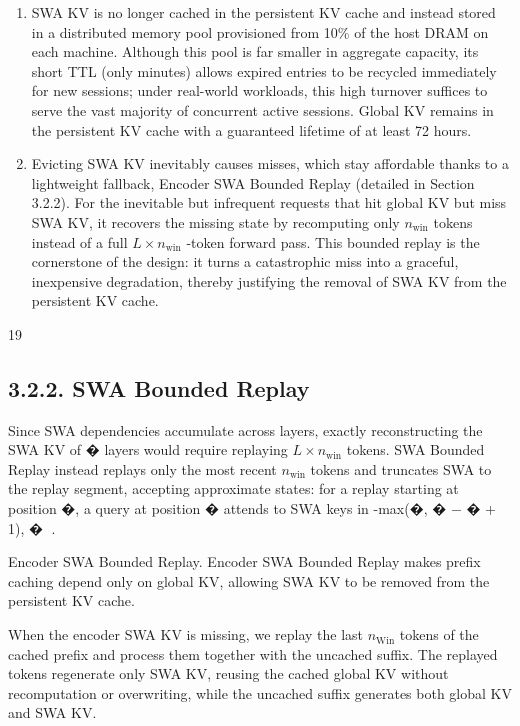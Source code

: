 \documentclass[
  10
]{article}
\begin{document}
\begin{enumerate}
\def\labelenumi{\arabic{enumi}.}
\item
  SWA KV is no longer cached in the persistent KV cache and instead
  stored in a distributed memory pool provisioned from 10\% of the host
  DRAM on each machine. Although this pool is far smaller in aggregate
  capacity, its short TTL (only minutes) allows expired entries to be
  recycled immediately for new sessions; under real-world workloads,
  this high turnover suffices to serve the vast majority of concurrent
  active sessions. Global KV remains in the persistent KV cache with a
  guaranteed lifetime of at least 72 hours.
\item
  Evicting SWA KV inevitably causes misses, which stay affordable thanks
  to a lightweight fallback, Encoder SWA Bounded Replay (detailed in
  Section 3.2.2). For the inevitable but infrequent requests that hit
  global KV but miss SWA KV, it recovers the missing state by
  recomputing only \(n _ { \mathrm { w i n } }\) tokens instead of a
  full \(L \times n _ { \mathrm { w i n } }\) -token forward pass. This
  bounded replay is the cornerstone of the design: it turns a
  catastrophic miss into a graceful, inexpensive degradation, thereby
  justifying the removal of SWA KV from the persistent KV cache.
\end{enumerate}

19

\subsection{3.2.2. SWA Bounded Replay}\label{swa-bounded-replay}

Since SWA dependencies accumulate across layers, exactly reconstructing
the SWA KV of � layers would require replaying
\(L \times n _ { \mathrm { w i n } }\) tokens. SWA Bounded Replay
instead replays only the most recent \(n _ { \mathrm { { w i n } } }\)
tokens and truncates SWA to the replay segment, accepting approximate
states: for a replay starting at position �, a query at position �
attends to SWA keys in -max(�, � − � + 1), � .

Encoder SWA Bounded Replay. Encoder SWA Bounded Replay makes prefix
caching depend only on global KV, allowing SWA KV to be removed from the
persistent KV cache.

When the encoder SWA KV is missing, we replay the last
\(n _ { \mathrm { W i n } }\) tokens of the cached prefix and process
them together with the uncached suffix. The replayed tokens regenerate
only SWA KV, reusing the cached global KV without recomputation or
overwriting, while the uncached suffix generates both global KV and SWA
KV.
\end{document}
